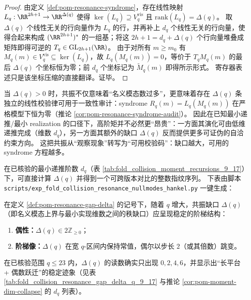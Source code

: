 \begin{proof}
由定义 \ref{def:pom-resonance-syndrome}，存在线性映射 \(L_q:\RR^{2h+1}\to\RR^{\Delta(q)}\) 使得 \(\ker(L_q)\supseteq V_q^{\mathrm{vis}}\) 且 \(\mathrm{rank}(L_q)=\Delta(q)\)。
取 \(\Delta(q)\) 个线性无关的行向量作为 \(L_q\) 的行，并再补上 \(d_q\) 个线性无关的行向量，使得合起来构成 \((\RR^{2h+1})^\ast\) 的一组基；将这 \(2h+1=d_q+\Delta(q)\) 个行向量堆叠成矩阵即得可逆的 \(T_q\in\mathrm{GL}_{2h+1}(\RR)\)。
由于对所有 \(m\ge m_0\) 有 \(M_q(m)\in V_q^{\mathrm{vis}}\subseteq\ker(L_q)\)，故
\(
L_q(M_q(m))=0
\)，等价于 \(T_q M_q(m)\) 的最后 \(\Delta(q)\) 个坐标恒为零；前 \(d_q\) 个坐标记为 \(\widetilde M_q(m)\) 即得所示形式。
寄存器表述只是该坐标压缩的直接翻译。证毕。
\end{proof}

\begin{remark}\label{rem:pom-resonance-as-resource}
当 \(\Delta(q)>0\) 时，共振不仅意味着“名义模态数过多”，更意味着存在 \(\Delta(q)\) 条独立的线性校验律可用于一致性审计：syndrome \(R_q(m)=L_q(M_q(m))\) 在严格模型下恒为零（推论 \ref{cor:pom-resonance-syndrome-audit}）。
因此在已知最小递推/最小 realization 的口径下，高阶矩并不必然更“昂贵”：一方面其演化可由低维递推完成（维数 \(d_q\)），另一方面其额外的缺口 \(\Delta(q)\) 反而提供更多可证伪的自洽约束方向。
这把共振从“观察现象”转写为“可用校验码”：缺口越大，可用的 syndrome 方程越多。
\end{remark}

\begin{remark}[已核验窗口内的 \texorpdfstring{$\Delta(q)$}{Delta(q)} 读数（\(q=9,\dots,17\)）]\label{rem:pom-delta-q9-17}
在已核验的最小递推阶数 \(d_q\)（表 \ref{tab:fold_collision_moment_recursions_9_17}）下，可直接计算 \(\Delta(q)\) 并得到一个可跨版本对比的整数指纹序列。
下表由脚本 \texttt{scripts/exp\_fold\_collision\_resonance\_nullmodes\_hankel.py} 一键生成：
\end{remark}



\begin{conjecture}\label{conj:pom-delta-staircase}
在定义 \ref{def:pom-resonance-gap-delta} 的记号下，随着 \(q\) 增大，共振缺口 \(\Delta(q)\)（即名义模态上界与最小实现维数之间的秩缺口）应呈现稳定的阶梯结构：
\begin{enumerate}
  \item \textbf{偶性：}\(\Delta(q)\in 2\mathbb{Z}_{\ge 0}\)；
  \item \textbf{阶梯像：}\(\Delta(q)\) 在宽 \(q\)-区间内保持常值，偶尔以步长 \(2\)（或其倍数）跳变。
\end{enumerate}
在已核验范围 \(q\le 23\) 内，\(\Delta(q)\) 的读数确实只出现 \(0,2,4,6\)，并显示出“长平台 + 偶数跃迁”的稳定迹象（见表 \ref{tab:fold_collision_resonance_gap_delta_q_9_17} 与推论 \ref{cor:pom-moment-dim-collapse} 的 \(d_q\) 列表）。
\end{conjecture}

